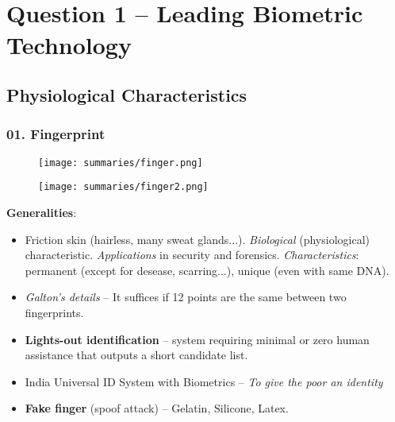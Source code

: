 \documentclass[a4paper]{article}
\title{\vspace{-.25cm} \HWTitle \\ \vspace{.25cm}}
\author{\HWAuthorName}
\begin{document}
\maketitle

\section*{Question 1 -- Leading Biometric Technology} %
\label{sec:question_1}

  \subsection*{Physiological Characteristics}
    \subsubsection*{01. Fingerprint}
      \begin{figure}[htp]
        \centering
          \texttt{[image: summaries/finger.png]}
      \end{figure}
      \begin{figure}[htp]
        \centering
          \texttt{[image: summaries/finger2.png]}
      \end{figure}
      \newpage
      \textbf{Generalities}:
      \begin{itemize}
        \item Friction skin (hairless, many sweat glands...). \emph{Biological} (physiological) characteristic. \emph{Applications} in security and forensics. \emph{Characteristics}: permanent (except for desease, scarring...), unique (even with same DNA).
        \item \emph{Galton's details} -- It suffices if 12 points are the same between two fingerprints.
        \item \textbf{Lights-out identification} -- system requiring minimal or zero human assistance that outputs a short candidate list.
        \item India Universal ID System with Biometrics -- \emph{To give the poor an identity}
        \item \textbf{Fake finger} (spoof attack) -- Gelatin, Silicone, Latex.
      \end{itemize}
\end{document}
